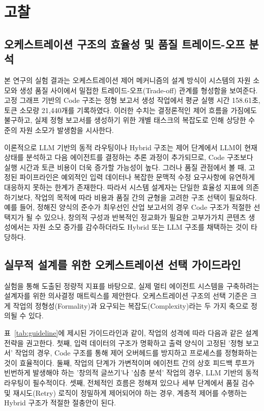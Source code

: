 \documentclass[10pt,twocolumn]{article}
\begin{document}
\section{고찰}
\subsection{오케스트레이션 구조의 효율성 및 품질 트레이드-오프 분석}

본 연구의 실험 결과는 오케스트레이션 제어 메커니즘의 설계 방식이 시스템의 자원 소모와 생성 품질 사이에서 밀접한 트레이드-오프(Trade-off) 관계를 형성함을 보여준다. 고정 그래프 기반의 Code 구조는 정형 보고서 생성 작업에서 평균 실행 시간 158.61초, 토큰 소모량 21,440개를 기록하였다. 이러한 수치는 결정론적인 제어 흐름을 가짐에도 불구하고, 실제 정형 보고서를 생성하기 위한 개별 태스크의 복잡도로 인해 상당한 수준의 자원 소모가 발생함을 시사한다.

이론적으로 LLM 기반의 동적 라우팅이나 Hybrid 구조는 제어 단계에서 LLM이 현재 상태를 분석하고 다음 에이전트를 결정하는 추론 과정이 추가되므로, Code 구조보다 실행 시간과 토큰 비용이 더욱 증가할 가능성이 높다. 그러나 품질 관점에서 볼 때, 고정된 파이프라인은 예외적인 입력 데이터나 복잡한 문맥적 수정 요구사항에 유연하게 대응하지 못하는 한계가 존재한다. 따라서 시스템 설계자는 단일한 효율성 지표에 의존하기보다, 작업의 목적에 따라 비용과 품질 간의 균형을 고려한 구조 선택이 필요하다. 예를 들어, 정해진 양식의 준수가 최우선인 산업 보고서의 경우 Code 구조가 적절한 선택지가 될 수 있으나, 창의적 구성과 반복적인 정교화가 필요한 고부가가치 콘텐츠 생성에서는 자원 소모 증가를 감수하더라도 Hybrid 또는 LLM 구조를 채택하는 것이 타당하다.

\subsection{실무적 설계를 위한 오케스트레이션 선택 가이드라인}

실험을 통해 도출된 정량적 지표를 바탕으로, 실제 멀티 에이전트 시스템을 구축하려는 설계자를 위한 의사결정 매트릭스를 제안한다. 오케스트레이션 구조의 선택 기준은 크게 작업의 정형성(Formality)과 요구되는 복잡도(Complexity)라는 두 가지 축으로 정의될 수 있다.

표~\ref{tab:guideline}에 제시된 가이드라인과 같이, 작업의 성격에 따라 다음과 같은 설계 전략을 권고한다. 첫째, 입력 데이터의 구조가 명확하고 출력 양식이 고정된 '정형 보고서' 작업의 경우, Code 구조를 통해 제어 오버헤드를 방지하고 프로세스를 정형화하는 것이 효율적이다. 둘째, 작업의 단계가 가변적이며 에이전트 간의 상호 피드백 루프가 빈번하게 발생해야 하는 '창의적 글쓰기'나 '심층 분석' 작업의 경우, LLM 기반의 동적 라우팅이 필수적이다. 셋째, 전체적인 흐름은 정해져 있으나 세부 단계에서 품질 검수 및 재시도(Retry) 로직이 정밀하게 제어되어야 하는 경우, 계층적 제어를 수행하는 Hybrid 구조가 적절한 절충안이 된다.
\end{document}
